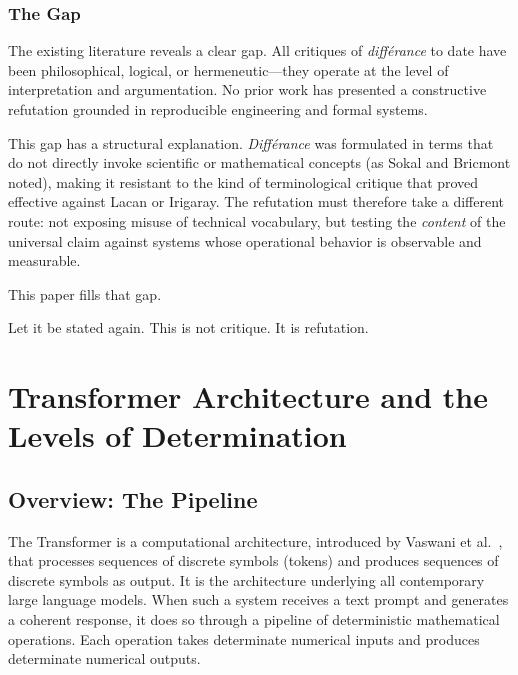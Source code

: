 \documentclass[a4paper,twocolumn,11pt]{article}
\begin{document}
\subsubsection{The Gap}

The existing literature reveals a clear gap. All critiques of \emph{diff\'erance} to date have been philosophical, logical, or hermeneutic---they operate at the level of interpretation and argumentation. No prior work has presented a constructive refutation grounded in reproducible engineering and formal systems.

This gap has a structural explanation. \emph{Diff\'erance} was formulated in terms that do not directly invoke scientific or mathematical concepts (as Sokal and Bricmont noted), making it resistant to the kind of terminological critique that proved effective against Lacan or Irigaray. The refutation must therefore take a different route: not exposing misuse of technical vocabulary, but testing the \emph{content} of the universal claim against systems whose operational behavior is observable and measurable.

This paper fills that gap.

Let it be stated again. This is not critique. It is refutation.



\section{Transformer Architecture and the Levels of Determination}
\label{sec:transformer}

\subsection{Overview: The Pipeline}
\label{sec:pipeline}

The Transformer is a computational architecture, introduced by Vaswani et al.~\cite{Vaswani2017}, that processes sequences of discrete symbols (tokens) and produces sequences of discrete symbols as output. It is the architecture underlying all contemporary large language models. When such a system receives a text prompt and generates a coherent response, it does so through a pipeline of deterministic mathematical operations. Each operation takes determinate numerical inputs and produces determinate numerical outputs.
\end{document}
